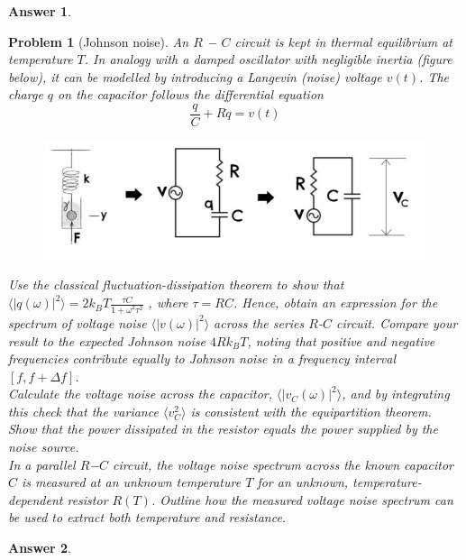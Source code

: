 \documentclass[a4paper]{article}
\newtheorem{ans}{Answer}[section]
\theoremstyle{new}
\newtheorem{qns}{Problem}[section]
\begin{document}
\begin{ans}

\end{ans}
\newpage
\begin{qns}[Johnson noise]
An $R$ − $C$ circuit is kept in thermal equilibrium at temperature $T$. In analogy with a damped oscillator with negligible inertia (figure below), it can be modelled by introducing a Langevin (noise) voltage $v(t)$. The charge $q$ on the capacitor follows the differential equation
$$\frac{q}{C}+R\dot{q}=v(t)$$
\begin{figure}[H]
    \centering
    \includegraphics[width=\linewidth]{TSPEx4Q9.JPG}
\end{figure}
Use the classical fluctuation-dissipation theorem to show that $\langle|q(\omega)|^2\rangle=2k_BT\frac{\tau C}{1+\omega^2\tau^2}$ , where $\tau=RC$. Hence, obtain an expression for the spectrum of voltage noise $\langle|v(\omega)|^2\rangle$ across the series $R$-$C$ circuit. Compare your result to the expected Johnson noise $4Rk_BT$, noting that positive and negative frequencies contribute equally to Johnson noise in a frequency interval $[f,f + \Delta f]$.\\[5pt]
Calculate the voltage noise across the capacitor, $\langle|v_C(\omega)|^2\rangle$, and by integrating this check that the variance $\langle v_C^2\rangle$ is consistent with the equipartition theorem.\\[5pt]
Show that the power dissipated in the resistor equals the power supplied by the noise source.\\[5pt]
In a parallel $R$−$C$ circuit, the voltage noise spectrum across the known capacitor $C$ is measured at an unknown temperature $T$ for an unknown, temperature-dependent resistor $R(T)$. Outline how the measured voltage noise spectrum can be used to extract both temperature and resistance.
\end{qns}
\begin{ans}

\end{ans}
\newpage
\end{document}
